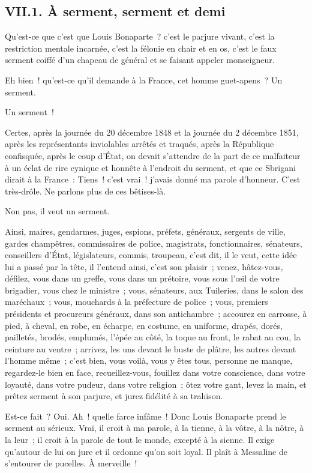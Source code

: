 \documentclass[french,twoside]{book} %
\begin{document}
\subsection[{VII.1. À serment, serment et demi}]{VII.1. À serment, serment et demi}
\noindent Qu’est-ce que c’est que Louis Bonaparte ? c’est le parjure vivant, c’est la restriction mentale incarnée, c’est la félonie en chair et en os, c’est le faux serment coiffé d’un chapeau de général et se faisant appeler monseigneur.\par
Eh bien ! qu’est-ce qu’il demande à la France, cet homme guet-apens ? Un serment.\par
Un serment !\par
Certes, après la journée du 20 décembre 1848 et la journée du 2 décembre 1851, après les représentants inviolables arrêtés et traqués, après la République confisquée, après le coup d’État, on devait s’attendre de la part de ce malfaiteur à un éclat de rire cynique et honnête à l’endroit du serment, et que ce Sbrigani dirait à la France : Tiens ! c’est vrai ! j’avais donné ma parole d’honneur. C’est très-drôle. Ne parlons plus de ces bêtises-là.\par
Non pas, il veut un serment.\par
Ainsi, maires, gendarmes, juges, espions, préfets, généraux, sergents de ville, gardes champêtres, commissaires de police, magistrats, fonctionnaires, sénateurs, conseillers d’État, législateurs, commis, troupeau, c’est dit, il le veut, cette idée lui a passé par la tête, il l’entend ainsi, c’est son plaisir ; venez, hâtez-vous, défilez, vous dans un greffe, vous dans un prétoire, vous sous l’œil de votre brigadier, vous chez le ministre ; vous, sénateurs, aux Tuileries, dans le salon des maréchaux ; vous, mouchards à la préfecture de police ; vous, premiers présidents et procureurs généraux, dans son antichambre ; accourez en carrosse, à pied, à cheval, en robe, en écharpe, en costume, en uniforme, drapés, dorés, pailletés, brodés, emplumés, l’épée au côté, la toque au front, le rabat au cou, la ceinture au ventre ; arrivez, les uns devant le buste de plâtre, les autres devant l’homme même ; c’est bien, vous voilà, vous y êtes tous, personne ne manque, regardez-le bien en face, recueillez-vous, fouillez dans votre conscience, dans votre loyauté, dans votre pudeur, dans votre religion ; ôtez votre gant, levez la main, et prêtez serment à son parjure, et jurez fidélité à sa trahison.\par
Est-ce fait ? Oui. Ah ! quelle farce infâme ! Donc Louis Bonaparte prend le serment au sérieux. Vrai, il croit à ma parole, à la tienne, à la vôtre, à la nôtre, à la leur ; il croit à la parole de tout le monde, excepté à la sienne. Il exige qu’autour de lui on jure et il ordonne qu’on soit loyal. Il plaît à Messaline de s’entourer de pucelles. À merveille !\par
\end{document}

